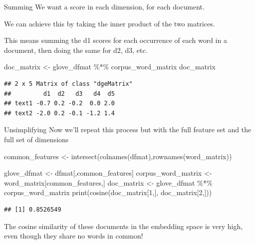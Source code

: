 \documentclass[
  10pt,
  ignorenonframetext,
  aspectratio=169]{beamer}
\newenvironment{Shaded}{\begin{snugshade}}{\end{snugshade}}
\newcommand{\DecValTok}[1]{\textcolor[rgb]{0.86,0.86,0.80}{#1}}
\newcommand{\FunctionTok}[1]{\textcolor[rgb]{0.94,0.94,0.56}{#1}}
\newcommand{\NormalTok}[1]{\textcolor[rgb]{0.80,0.80,0.80}{#1}}
\newcommand{\OtherTok}[1]{\textcolor[rgb]{0.94,0.94,0.56}{#1}}
\newcommand{\SpecialCharTok}[1]{\textcolor[rgb]{0.86,0.64,0.64}{#1}}
\begin{document}
\begin{frame}[fragile]{Summing}
\protect\hypertarget{summing}{}
We want a score in each dimension, for each document.

We can achieve this by taking the inner product of the two matrices.

This means summing the d1 scores for each occurrence of each word in a
document, then doing the same for d2, d3, etc.

\medskip

\scriptsize

\begin{Shaded}
\begin{Highlighting}[]
\NormalTok{doc\_matrix }\OtherTok{\textless{}{-}}\NormalTok{ glove\_dfmat }\SpecialCharTok{\%*\%}\NormalTok{ corpus\_word\_matrix}
\NormalTok{doc\_matrix}
\end{Highlighting}
\end{Shaded}

\begin{verbatim}
## 2 x 5 Matrix of class "dgeMatrix"
##         d1  d2   d3   d4  d5
## text1 -0.7 0.2 -0.2  0.0 2.0
## text2 -2.0 0.2 -0.1 -1.2 1.4
\end{verbatim}
\end{frame}

\begin{frame}[fragile]{Unsimplifying}
\protect\hypertarget{unsimplifying}{}
Now we'll repeat this process but with the full feature set and the full
set of dimensions

\medskip

\scriptsize

\begin{Shaded}
\begin{Highlighting}[]
\NormalTok{common\_features }\OtherTok{\textless{}{-}} \FunctionTok{intersect}\NormalTok{(}\FunctionTok{colnames}\NormalTok{(dfmat),}\FunctionTok{rownames}\NormalTok{(word\_matrix))}

\NormalTok{glove\_dfmat }\OtherTok{\textless{}{-}}\NormalTok{ dfmat[,common\_features]}
\NormalTok{corpus\_word\_matrix }\OtherTok{\textless{}{-}}\NormalTok{ word\_matrix[common\_features,]}
\NormalTok{doc\_matrix }\OtherTok{\textless{}{-}}\NormalTok{ glove\_dfmat }\SpecialCharTok{\%*\%}\NormalTok{ corpus\_word\_matrix}
\FunctionTok{print}\NormalTok{(}\FunctionTok{cosine}\NormalTok{(doc\_matrix[}\DecValTok{1}\NormalTok{,], doc\_matrix[}\DecValTok{2}\NormalTok{,]))}
\end{Highlighting}
\end{Shaded}

\begin{verbatim}
## [1] 0.8526549
\end{verbatim}

\medskip

\normalsize

The cosine similarity of these documents in the embedding space is very
high, even though they share no words in common!
\end{frame}
\end{document}
